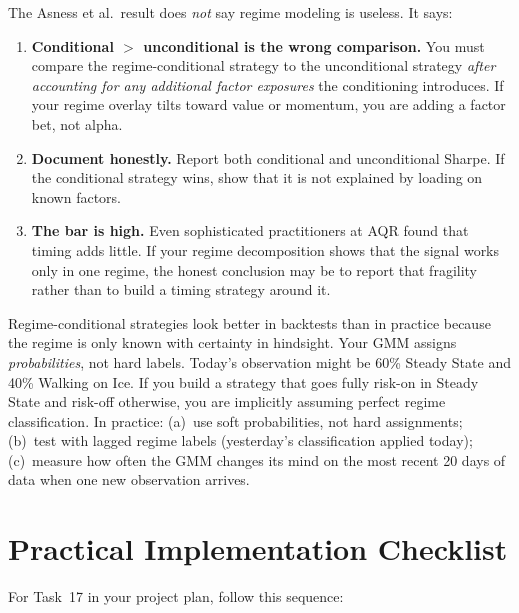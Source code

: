 The Asness et al.\ result does \emph{not} say regime modeling is useless.
It says:

\begin{enumerate}[leftmargin=1.5em]
  \item \textbf{Conditional $>$ unconditional is the wrong comparison.}
    You must compare the regime-conditional strategy to the unconditional
    strategy \emph{after accounting for any additional factor exposures} the
    conditioning introduces.  If your regime overlay tilts toward value or
    momentum, you are adding a factor bet, not alpha.
  \item \textbf{Document honestly.}  Report both conditional and
    unconditional Sharpe.  If the conditional strategy wins, show that it
    is not explained by loading on known factors.
  \item \textbf{The bar is high.}  Even sophisticated practitioners at AQR
    found that timing adds little.  If your regime decomposition shows that
    the signal works only in one regime, the honest conclusion may be to
    report that fragility rather than to build a timing strategy around it.
\end{enumerate}

\begin{warning}
Regime-conditional strategies look better in backtests than in practice
because the regime is only known with certainty in hindsight.  Your GMM
assigns \emph{probabilities}, not hard labels.  Today's observation might
be 60\% Steady State and 40\% Walking on Ice.  If you build a strategy
that goes fully risk-on in Steady State and risk-off otherwise, you are
implicitly assuming perfect regime classification.  In practice: (a)~use
soft probabilities, not hard assignments; (b)~test with lagged regime
labels (yesterday's classification applied today); (c)~measure how
often the GMM changes its mind on the most recent 20 days of data when
one new observation arrives.
\end{warning}

\section{Practical Implementation Checklist}
\label{sec:regimes:checklist}

For Task~17 in your project plan, follow this sequence:

